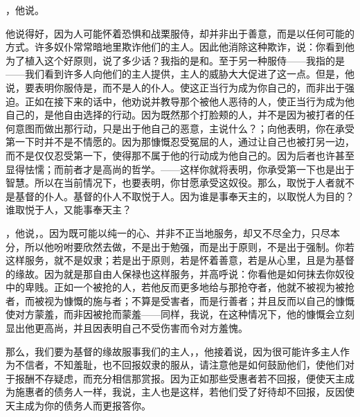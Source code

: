 ，他说。\par

他说得好，因为人可能怀着恐惧和战栗服侍，却并非出于善意，而是以任何可能的方式。许多奴仆常常暗地里欺诈他们的主人。因此他消除这种欺诈，说：你看到他为了植入这个好原则，说了多少话？我指的是和。至于另一种服侍——我指的是——我们看到许多人向他们的主人提供，主人的威胁大大促进了这一点。但是，他说，要表明你服侍是，而不是人的仆人。使这正当行为成为你自己的，而非出于强迫。正如在接下来的话中，他劝说并教导那个被他人恶待的人，使正当行为成为他自己的，是他自由选择的行动。因为既然那个打脸颊的人，并不是因为被打者的任何意图而做出那行动，只是出于他自己的恶意，主说什么？；向他表明，你在承受第一下时并不是不情愿的。因为那慷慨忍受冤屈的人，通过让自己也被打另一边，而不是仅仅忍受第一下，使得那不属于他的行动成为他自己的。因为后者也许甚至显得怯懦；而前者才是高尚的哲学。——这样你就将表明，你承受第一下也是出于智慧。所以在当前情况下，也要表明，你甘愿承受这奴役。那么，取悦于人者就不是基督的仆人。基督的仆人不取悦于人。因为谁是事奉天主的，以取悦人为目的？谁取悦于人，又能事奉天主？\par

，他说，。因为既可能以纯一的心、并非不正当地服务，却又不尽全力，只尽本分，所以他吩咐要欣然去做，不是出于勉强，而是出于原则，不是出于强制。你若这样服务，就不是奴隶；若是出于原则，若是怀着善意，若是从心里，且是为基督的缘故。因为就是那自由人保禄也这样服务，并高呼说：你看他是如何抹去你奴役中的卑贱。正如一个被抢的人，若他反而更多地给与那抢夺者，他就不被视为被抢者，而被视为慷慨的施与者；不算是受害者，而是行善者；并且反而以自己的慷慨使对方蒙羞，而非因被抢而蒙羞——同样，我说，在这种情况下，他的慷慨会立刻显出他更高尚，并且因表明自己不受伤害而令对方羞愧。\par

那么，我们要为基督的缘故服事我们的主人，，他接着说，因为很可能许多主人作为不信者，不知羞耻，也不回报奴隶的服从，请注意他是如何鼓励他们，使他们对于报酬不存疑虑，而充分相信那赏报。因为正如那些受惠者若不回报，便使天主成为施惠者的债务人一样，我说，主人也是这样，若他们受了好待却不回报，反因使天主成为你的债务人而更报答你。\par

